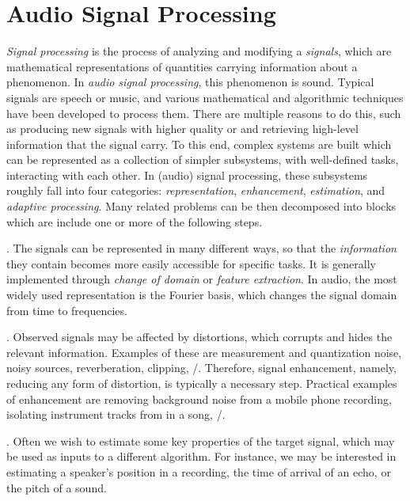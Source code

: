\section{Audio Signal Processing}\label{sec:intro:processing}
\textit{Signal processing} is the process of analyzing and modifying a \textit{signals}, which are mathematical representations of quantities carrying information about a phenomenon.
In \textit{audio signal processing}, this phenomenon is sound.
Typical signals are speech or music, and various mathematical and algorithmic techniques have been developed to process them.
There are multiple reasons to do this, such as producing new signals with higher quality or and retrieving high-level information that the signal carry.
To this end, complex systems are built which can be represented as a collection of simpler subsystems, with well-defined tasks, interacting with each other.
In (audio) signal processing, these subsystems roughly fall into four categories: \textit{representation}, \textit{enhancement}, \textit{estimation}, and \textit{adaptive processing}.
Many related problems can be then decomposed into blocks which are include one or more of the following steps.

.
    The signals can be represented in many different ways, so that the \textit{information} they contain becomes more easily accessible for specific tasks.
    It is generally implemented through \textit{change of domain} or \textit{feature extraction}.
    In audio, the most widely used representation is the Fourier basis, which changes the signal domain from time to frequencies.

.
    Observed signals may be affected by distortions, which corrupts and hides the relevant information.
    Examples of these are measurement and quantization noise, noisy sources, reverberation, clipping, \etc/.
    Therefore, signal enhancement, namely, reducing any form of distortion, is typically a necessary step.
    Practical examples of enhancement are removing background noise from a mobile phone recording, isolating instrument tracks from in a song, \etc/.

.
    Often we wish to estimate some key properties of the target signal, which may be used as inputs to a different algorithm.
    For instance, we may be interested in estimating a speaker's position in a recording, the time of arrival of an echo, or the pitch of a sound.

